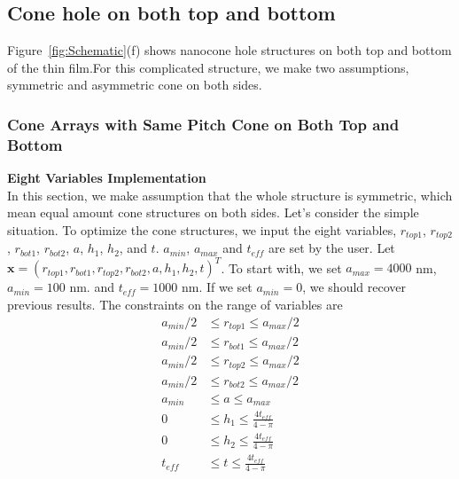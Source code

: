 \documentclass[12pt]{article}
\numberwithin{equation}{section}
\numberwithin{equation}{section}
\begin{document}
\subsection{Cone hole on both top and bottom} 
Figure~\ref{fig:Schematic}(f) shows nanocone hole structures on both top and bottom of the thin film.For this complicated structure, we make two assumptions, symmetric and asymmetric cone on both sides. 
\subsubsection{Cone Arrays with Same Pitch Cone on Both Top and Bottom}
\begin{outline}[enumerate]
\1 \textbf{Eight Variables Implementation} \\
In this section, we make assumption that the whole structure is symmetric, which mean equal amount cone structures on both sides. Let's consider the simple situation. To optimize the cone structures, we input the eight variables, $r_{top1}$, $r_{top2}$, $r_{bot1}$, $r_{bot2}$, $a$, $h_1$, $h_2$, and $t$. $a_{min}$, $a_{max}$ and $t_{eff}$ are set by the user. Let $\mathbf{x} = \left ( r_{top1}, r_{bot1}, r_{top2}, r_{bot2}, a, h_1, h_2, t  \right )^T $. To start with, we set $a_{max} = 4000$ nm, $a_{min} = 100$ nm.  and $t_{eff} = 1000$ nm. If we set $a_{min} = 0$, we should recover previous results.
The constraints on the range of variables are
\begin{align*}
a_{min}/2 & \leq r_{top1} \leq a_{max}/2 \\
a_{min}/2 & \leq r_{bot1} \leq a_{max}/2 \\
a_{min}/2 & \leq r_{top2} \leq a_{max}/2 \\
a_{min}/2 & \leq r_{bot2} \leq a_{max}/2 \\
a_{min} & \leq a \leq a_{max} \\
0 & \leq h_1 \leq  \frac {4t_{eff}}{4- \pi}\\ 
0 & \leq h_2 \leq  \frac {4t_{eff}}{4- \pi}\\
t_{eff} & \leq t \leq \frac {4t_{eff}}{4- \pi}
\end{align*}


\end{outline}
\end{document}
